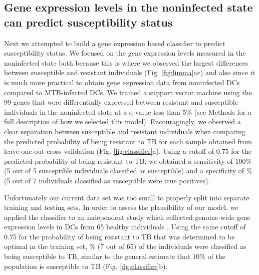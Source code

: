 \documentclass[fleqn,10pt]{wlscirep}
\begin{document}
\subsection*{Gene expression levels in the noninfected state can predict susceptibility status}

Next we attempted to build a gene expression based classifier to
predict susceptibility status. We focused on the gene expression
levels measured in the noninfected state both because this is where we
observed the largest differences between susceptible and resistant
individuals (Fig. \ref{fig:limma}ac) and also since it is much more
practical to obtain gene expression data from noninfected DCs compared
to MTB-infected DCs. We trained a support vector machine using the 99
genes that were differentially expressed between resistant and
susceptible individuals in the noninfected state at a q-value less
than 5\% (see Methods for a full description of how we selected this
model). Encouragingly, we observed a clear separation between
susceptible and resistant individuals when comparing the predicted
probability of being resistant to TB for each sample obtained from
leave-one-out-cross-validation (Fig. \ref{fig:classifier}a). Using a
cutoff of 0.75 for the predicted probability of being resistant to TB,
we obtained a sensitivity of 100\% (5 out of 5 susceptible individuals
classified as susceptible) and a specificity of \% (5
out of 7 individuals classified as susceptible were true positives).

Unfortunately our current data set was too small to properly split
into separate training and testing sets. In order to assess the
plausibility of our model, we applied the classifier to an independent
study which collected genome-wide gene expression levels in DCs from
65 healthy individuals \cite{Barreiro2012}. Using the same cutoff of
0.75 for the probability of being resistant to TB that was determined
to be optimal in the training set, \% (7 out of 65) of
the individuals were classified as being susceptible to TB, similar to
the general estimate that 10\% of the population is susceptible to TB
(Fig. \ref{fig:classifier}b).
\end{document}
